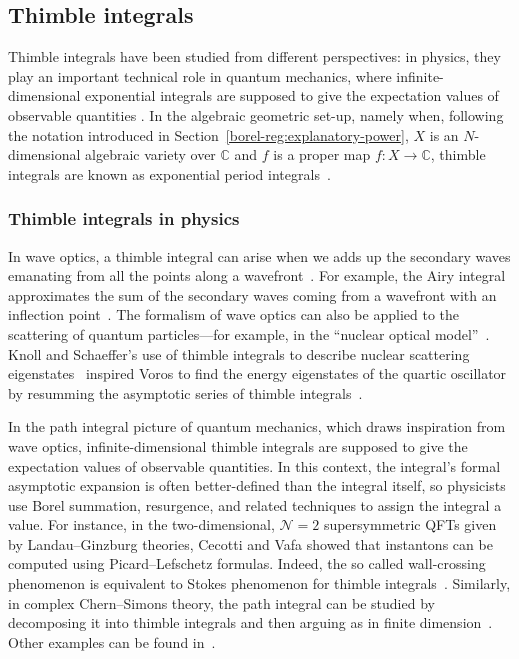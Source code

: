 \documentclass{article}
\newcommand{\C}{\mathbb{C}}
\theoremstyle{definition}
\theoremstyle{plain}
\begin{document}
\subsection{Thimble integrals}
%
Thimble integrals have been studied from different perspectives: in physics, they play an important technical role in quantum mechanics, where infinite-dimensional exponential integrals are supposed to give the expectation values of observable quantities \cite{dunne-unsal2,dunne-unsal,Fauvet_Menous_Queva,Tanizaki:2014tua}. In the algebraic geometric set-up, namely when, following the notation introduced in Section~\ref{borel-reg:explanatory-power}, $X$ is an $N$-dimensional algebraic variety over $\C$ and $f$ is a proper map $f\colon X\to\C$, thimble integrals are known as exponential period integrals~\cite{deligne2007singularites,Maxim_lectures,kontsevich-Fourier-exact,kontsevich2024holomorphic,fresan-notes}.
\subsubsection{Thimble integrals in physics}
In wave optics, a thimble integral can arise when we adds up the secondary waves emanating from all the points along a wavefront~\cite{Fenyes-ihes-lecture}. For example, the Airy integral approximates the sum of the secondary waves coming from a wavefront with an inflection point~\cite{rainbows+glories}. The formalism of wave optics can also be applied to the scattering of quantum particles---for example, in the ``nuclear optical model''~\cite{nuclear-optical, nuclear-mie}. Knoll and Schaeffer's use of thimble integrals to describe nuclear scattering eigenstates~\cite{semiclass-scat} inspired Voros to find the energy eigenstates of the quartic oscillator by resumming the asymptotic series of thimble integrals~\cite{quartic-return}. 

In the path integral picture of quantum mechanics, which draws inspiration from wave optics, infinite-dimensional thimble integrals are supposed to give the expectation values of observable quantities. In this context, the integral's formal asymptotic expansion is often better-defined than the integral itself, so physicists use Borel summation, resurgence, and related techniques to assign the integral a value. For instance, in the two-dimensional, $\mathcal{N}=2$ supersymmetric QFTs given by Landau--Ginzburg theories, Cecotti and Vafa showed that instantons can be computed using Picard--Lefschetz formulas. Indeed, the so called wall-crossing phenomenon is equivalent to Stokes phenomenon for thimble integrals~\cite{Cecotti:1992rm}. Similarly, in complex Chern--Simons theory, the path integral can be studied by decomposing it into thimble integrals and then arguing as in finite dimension~\cite{gukov-marino-purtrov-resurgence,Witten}. Other examples can be found in~\cite{costin_kruskal,Garoufalidis--CS,GTM--CS,GGM,dunne-unsal2,dunne-unsal,Fauvet_Menous_Queva,Tanizaki:2014tua,Berry_Howls,Berry1991,Howls97,Howls,pham1988resurgence,Unsal--resurgence-gauge}.
%
\end{document}
